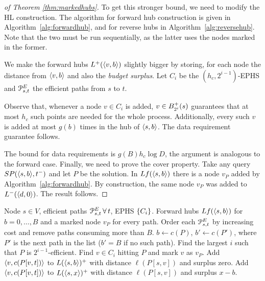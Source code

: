 
\begin{proof}[of Theorem \ref{thm:markedhubs}]
	To get this stronger bound, we need to modify the HL construction. The algorithm for forward hub construction is given in Algorithm~\ref{alg:forwardhub}, and for reverse hubs in Algorithm~\ref{alg:reversehub}. Note that the two must be run sequentially, as the latter uses the nodes marked in the former.
	
	
	We make the forward hubs $\Lf(\pp{v,b})$ slightly bigger by storing, for each node the distance from $\pp{v,b}$ and also the \emph{budget surplus}.
	Let $C_i$ be the $(h_c,2^{i-1})$-EPHS and $\PE_{s,t}$ the efficient paths from $s$ to $t$.
	
	Observe that, whenever a node $v\in C_i$ is added, $v\in \Bf_{2^i}(s)$ guarantees that at most $h_c$ such points are needed for the whole process.
	Additionally, every such $v$ is added at most $g(b)$ times in the hub of $\pp{s,b}$.
	The data requirement guarantee follows.
	
	The bound for data requirements is $g(B) h_c\log D$, the argument is analogous to the forward case.
	Finally, we need to prove the cover property.
	Take any query $SP(\pp{s,b},t^-)$ and let $P$ be the solution.
	In $Lf(\pp{s,b})$ there is a node $v_P$ added by Algorithm~\ref{alg:forwardhub}.
	By construction, the same node $v_P$ was added to $\Lb(\pp{d,0})$. The result follows.
\end{proof}

\begin{algorithm}[!ht]
	\small
	\caption{Construction of forward hub}
	\label{alg:forwardhub}
	\begin{algorithmic}[1]
		\Require Node $s\in V$, efficient paths $\PE_{s,t}\,\forall\,t$, EPHS $\crl*{C_i}$.
		\Ensure Forward hubs $Lf(\pp{s,b})$ for $b=0,\ldots,B$ and a marked node $v_P$ for every path.
		\State Order each $\PE_{s,t}$ by increasing cost and remove paths consuming more than $B$.
		\State $b\gets c(P)$, $b'\gets c(P')$, where $P'$ is the next path in the list ($b'=B$ if no such path).
		\State Find the largest $i$ such that $P$ is $2^{i-1}$-efficient.
		\State Find $v\in C_i$ hitting $P$ and mark $v$ as $v_P$.
		\State Add $\pp{v,c(P[v,t])}$ to $L(\pp{s,b})^+$  with distance $\ell(P[s,v])$ and surplus zero.
		\State Add $\pp{v,c(P[v,t])}$ to $L(\pp{s,x})^+$  with distance $\ell(P[s,v])$ and surplus $x-b$.
		\EndFor
		\EndFor
		\EndFor
	\end{algorithmic}
\end{algorithm}

